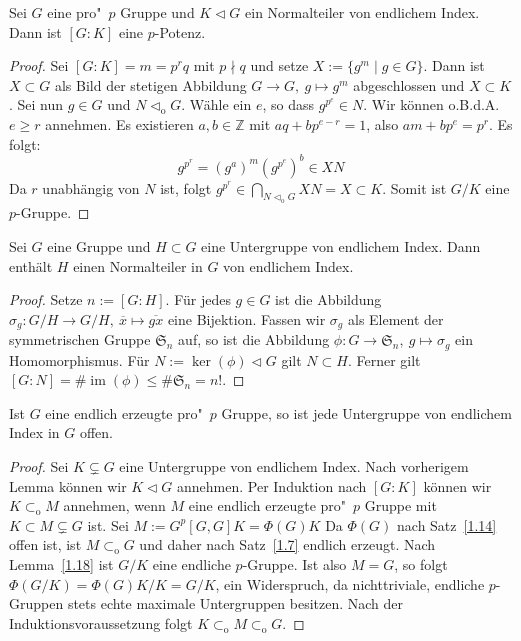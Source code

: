 \documentclass[11pt,a4paper,openany]{memoir}
\begin{document}
\begin{lemma}\label{1.18}
Sei $G$ eine pro"~$p$ Gruppe und $K\lhd G$ ein Normalteiler von endlichem Index. Dann ist $[G:K]$ eine $p$-Potenz.
\end{lemma}

\begin{proof}
Sei $[G:K]=m=p^r q$ mit $p\nmid q$ und setze $X:=\{g^m\mid g\in G\}$. Dann ist $X\subset G$ als Bild der stetigen Abbildung $G\to G,\ g\mapsto g^m$ abgeschlossen und $X\subset K$. Sei nun $g\in G$ und $N\lhd_\text{o}G$. Wähle ein $e$, so dass $g^{p^e}\in N$. Wir können o.B.d.A. $e\geq r$ annehmen.  Es existieren $a,b\in\mathbb{Z}$ mit $aq+bp^{e-r}=1$, also $am+bp^e=p^r$. Es folgt:
\[g^{p^r}=(g^a)^m(g^{p^e})^b\in XN \]
Da $r$ unabhängig von $N$ ist, folgt $g^{p^r}\in \bigcap_{N\lhd_\text{o}G} XN=X\subset K$. Somit ist $G/K$ eine $p$-Gruppe.
\end{proof}

\begin{lemma}
Sei $G$ eine Gruppe und $H\subset G$ eine Untergruppe von endlichem Index. Dann enthält $H$ einen Normalteiler in $G$ von endlichem Index.
\end{lemma}

\begin{proof}
Setze $n:=[G:H]$. Für jedes $g\in G$ ist die Abbildung $\sigma_g : G/H\to G/H,\ \overline{x}\mapsto \overline{gx}$ eine Bijektion. Fassen wir $\sigma_g$ als Element der symmetrischen Gruppe $\mathfrak{S}_n$ auf, so ist die Abbildung $\phi:G\to \mathfrak{S}_n,\ g\mapsto \sigma_g$ ein Homomorphismus. Für $N:=\ker(\phi)\lhd G$ gilt $N\subset H$. Ferner gilt $[G:N]=\#\operatorname{im}(\phi)\leq\#\mathfrak{S}_n = n!$.
\end{proof}

\begin{theorem}\label{1.17}
Ist $G$ eine endlich erzeugte pro"~$p$ Gruppe, so ist jede Untergruppe von endlichem Index in $G$ offen.
\end{theorem}

\begin{proof}
Sei $K\subsetneq G$ eine Untergruppe von endlichem Index. Nach vorherigem Lemma können wir $K\lhd G$ annehmen. Per Induktion nach $[G:K]$ können wir $K\subset_\text{o}M$ annehmen, wenn $M$ eine endlich erzeugte pro"~$p$ Gruppe mit $K\subset M\subsetneq G$ ist. Sei $M:=G^p[G,G]K=\Phi(G)K$ Da $\Phi(G)$ nach Satz~\ref{1.14} offen ist, ist $M\subset_\text{o}G$ und daher nach Satz~\ref{1.7} endlich erzeugt. Nach Lemma~\ref{1.18} ist $G/K$ eine endliche $p$-Gruppe. Ist also $M=G$, so folgt $\Phi(G/K)=\Phi(G)K/K=G/K$, ein Widerspruch, da nichttriviale, endliche $p$-Gruppen stets echte maximale Untergruppen besitzen. Nach der Induktionsvoraussetzung folgt $K\subset_\text{o}M\subset_\text{o}G$.
\end{proof}
\end{document}
